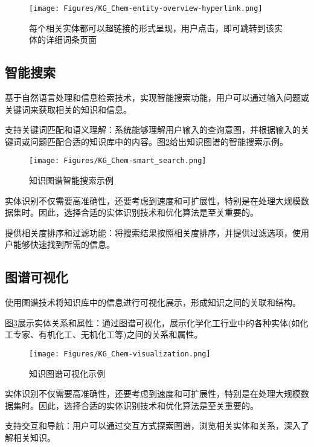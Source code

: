 \begin{figure}[h!]
\centering
\texttt{[image: Figures/KG\_Chem-entity-overview-hyperlink.png]}
\caption{\small\textrm{每个相关实体都可以超链接的形式呈现，用户点击，即可跳转到该实体的详细词条页面}}%
\label{Fig:KG-Chem_entity_overview-hyperlink}
\end{figure}

\subsection{智能搜索} 
基于自然语言处理和信息检索技术，实现智能搜索功能，用户可以通过输入问题或关键词来获取相关的知识和信息。

支持关键词匹配和语义理解：系统能够理解用户输入的查询意图，并根据输入的关键词或问题匹配合适的知识库中的内容。图\ref{Fig:KG-Chem_smart_search}给出知识图谱的智能搜索示例。
\begin{figure}[h!]
\centering
\texttt{[image: Figures/KG\_Chem-smart\_search.png]}
\caption{\small\textrm{知识图谱智能搜索示例}}%
\label{Fig:KG-Chem_smart_search}
\end{figure}
实体识别不仅需要高准确性，还要考虑到速度和可扩展性，特别是在处理大规模数据集时。因此，选择合适的实体识别技术和优化算法是至关重要的。

提供相关度排序和过滤功能：将搜索结果按照相关度排序，并提供过滤选项，使用户能够快速找到所需的信息。

\subsection{图谱可视化} 
使用图谱技术将知识库中的信息进行可视化展示，形成知识之间的关联和结构。

图\ref{Fig:KG-Chem_visualization}展示实体关系和属性：通过图谱可视化，展示化学化工行业中的各种实体(如化工专家、有机化工、无机化工等)之间的关系和属性。
\begin{figure}[h!]
\centering
\texttt{[image: Figures/KG\_Chem-visualization.png]}
\caption{\small\textrm{知识图谱可视化示例}}%
\label{Fig:KG-Chem_visualization}
\end{figure}
实体识别不仅需要高准确性，还要考虑到速度和可扩展性，特别是在处理大规模数据集时。因此，选择合适的实体识别技术和优化算法是至关重要的。

支持交互和导航：用户可以通过交互方式探索图谱，浏览相关实体和关系，深入了解相关知识。


